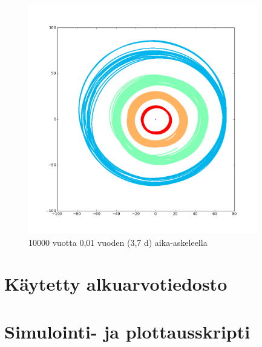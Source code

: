 \documentclass[12pt,a4paper,titlepage]{article}
\begin{document}
\begin{figure}
\centering
\includegraphics[width=10cm]{../kuvat/10000-001.png}
\caption{10000 vuotta 0,01 vuoden (3,7 d) aika-askeleella}
\label{10000-0.01}
\end{figure}

\newpage

 
\appendix
\newpage
\section{Käytetty alkuarvotiedosto} \label{alkuarvot}

\newpage
\section{Simulointi- ja plottausskripti} \label{skripti}

\newpage
\end{document}
